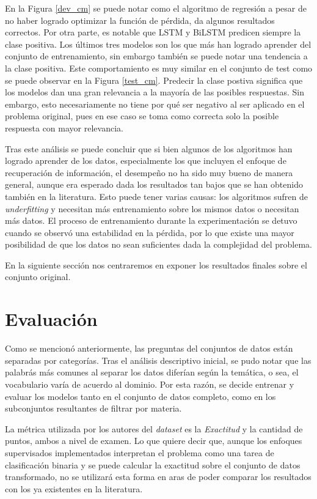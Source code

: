 En la Figura \ref{dev_cm} se puede notar como el algoritmo de regresión a pesar de no haber logrado optimizar la función de pérdida, da algunos resultados correctos. Por otra parte, es notable que LSTM y BiLSTM predicen siempre la clase positiva. Los últimos tres modelos son los que más han logrado aprender del conjunto de entrenamiento, sin embargo también se puede notar una tendencia a la clase positiva. Este comportamiento es muy similar en el conjunto de test como se puede observar en la Figura \ref{test_cm}. Predecir la clase postiva significa que los modelos dan una gran relevancia a la mayoría de las posibles respuestas. Sin embargo, esto necesariamente no tiene por qué ser negativo al ser aplicado en el problema original, pues en ese caso se toma como correcta solo la posible respuesta con mayor relevancia.

Tras este análisis se puede concluir que si bien algunos de los algoritmos han logrado aprender de los datos, especialmente los que incluyen el enfoque de recuperación de información, el desempeño no ha sido muy bueno de manera general, aunque era esperado dada los resultados tan bajos que se han obtenido también en la literatura. Esto puede tener varias causas: los algoritmos sufren de \textit{underfitting} y necesitan más entrenamiento sobre los mismos datos o necesitan más datos. El proceso de entrenamiento durante la experimentación se detuvo cuando se observó una estabilidad en la pérdida, por lo que existe una mayor posibilidad de que los datos no sean suficientes dada la complejidad del problema.

En la siguiente sección nos centraremos en exponer los resultados finales sobre el conjunto original.

\section{Evaluación}

Como se mencionó anteriormente, las preguntas del conjuntos de datos están separadas por categorías. Tras el análisis descriptivo inicial, se pudo notar que las palabrás más comunes al separar los datos diferían según la temática, o sea, el vocabulario varía de acuerdo al dominio. Por esta razón, se decide entrenar y evaluar los modelos tanto en el conjunto de datos completo, como en los subconjuntos resultantes de filtrar por materia.

La métrica utilizada por los autores del \textit{dataset} es la \textit{Exactitud} y la cantidad de puntos, ambos a nivel de examen. Lo que quiere decir que, aunque los enfoques supervisados implementados interpretan el problema como una tarea de clasificación binaria y se puede calcular la exactitud sobre el conjunto de datos transformado, no se utilizará esta forma en aras de poder comparar los resultados con los ya existentes en la literatura. 

